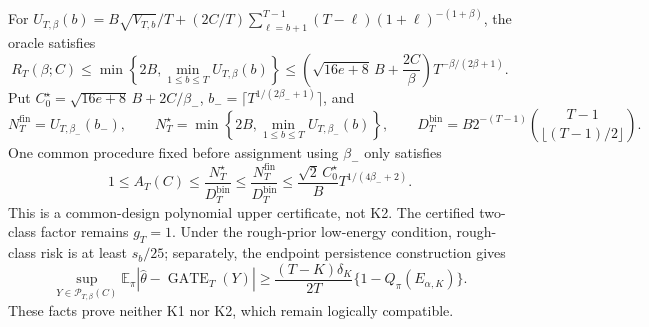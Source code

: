 For \(U_{T,\beta}(b)=B\sqrt{V_{T,b}}/T+(2C/T)\sum_{\ell=b+1}^{T-1}(T-\ell)(1+\ell)^{-(1+\beta)}\), the oracle satisfies \[R_T(\beta;C)\le\min\left\{2B,\min_{1\le b\le T}U_{T,\beta}(b)\right\}\le\left(\sqrt{16e+8}\,B+\frac{2C}{\beta}\right)T^{-\beta/(2\beta+1)}.\] Put \(C_0^\star=\sqrt{16e+8}\,B+2C/\beta_-\), \(b_-=\lceil T^{1/(2\beta_-+1)}\rceil\), and \[N_T^{\mathrm{fin}}=U_{T,\beta_-}(b_-),\qquad N_T^\star=\min\left\{2B,\min_{1\le b\le T}U_{T,\beta_-}(b)\right\},\qquad D_T^{\mathrm{bin}}=B2^{-(T-1)}\binom{T-1}{\lfloor(T-1)/2\rfloor}.\] One common procedure fixed before assignment using \(\beta_-\) only satisfies \[1\le A_T(C)\le\frac{N_T^\star}{D_T^{\mathrm{bin}}}\le\frac{N_T^{\mathrm{fin}}}{D_T^{\mathrm{bin}}}\le\frac{\sqrt2\,C_0^\star}{B}T^{1/(4\beta_-+2)}.\] This is a common-design polynomial upper certificate, not K2. The certified two-class factor remains \(g_T=1\). Under the rough-prior low-energy condition, rough-class risk is at least \(s_b/25\); separately, the endpoint persistence construction gives \[\sup_{Y\in\mathcal P_{T,\beta}(C)}\mathbb E_\pi|\widehat\theta-\operatorname{GATE}_T(Y)|\ge\frac{(T-K)\delta_K}{2T}\{1-Q_\pi(E_{\alpha,K})\}.\] These facts prove neither K1 nor K2, which remain logically compatible.